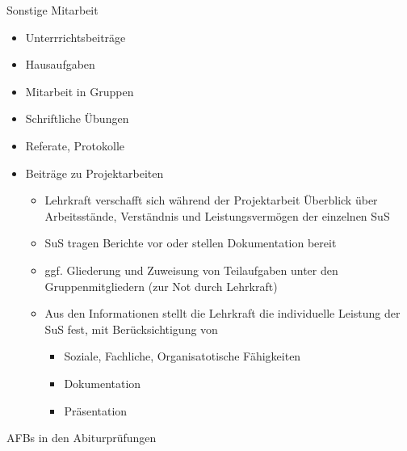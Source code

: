 \documentclass{article}
\begin{document}
\begin{block}{Sonstige Mitarbeit}
    \begin{itemize}
        \item Unterrrichtsbeiträge
        \item Hausaufgaben
        \item Mitarbeit in Gruppen
        \item Schriftliche Übungen
        \item Referate, Protokolle
        \item Beiträge zu Projektarbeiten
        \begin{itemize}
            \item Lehrkraft verschafft sich während der Projektarbeit Überblick über Arbeitsstände, Verständnis und Leistungsvermögen der einzelnen SuS
            \item SuS tragen Berichte vor oder stellen Dokumentation bereit
            \item ggf. Gliederung und Zuweisung von Teilaufgaben unter den Gruppenmitgliedern (zur Not durch Lehrkraft)
            \item Aus den Informationen stellt die Lehrkraft die individuelle Leistung der SuS fest, mit Berücksichtigung von
            \begin{itemize}
                \item Soziale, Fachliche, Organisatotische Fähigkeiten
                \item Dokumentation
                \item Präsentation
            \end{itemize}
        \end{itemize}
    \end{itemize}
\end{block}

\begin{block}{AFBs in den Abiturprüfungen}
    
\end{block}
\end{document}
